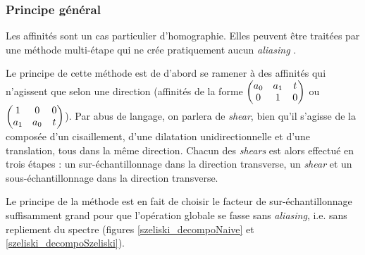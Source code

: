 \subsubsection{Principe général}
	
	Les affinités sont un cas particulier d'homographie. Elles peuvent être traitées par une méthode multi-étape qui ne crée pratiquement aucun \emph{aliasing} \cite{szeliski2010high}.
	
	Le principe de cette méthode est de d'abord se ramener à des affinités qui n'agissent que selon une direction (affinités de la forme $\begin{pmatrix} a_0 & a_1 & t\\ 0 & 1 & 0 \end{pmatrix}$ ou $\begin{pmatrix} 1 & 0 & 0\\ a_1 & a_0 & t \end{pmatrix}$). Par abus de langage, on parlera de \emph{shear}, bien qu'il s'agisse de la composée d'un cisaillement, d'une dilatation unidirectionnelle et d'une translation, tous dans la même direction. Chacun des \emph{shears} est alors effectué en trois étapes : un sur-échantillonnage dans la direction transverse, un \emph{shear} et un sous-échantillonnage dans la direction transverse.
	
	Le principe de la méthode est en fait de choisir le facteur de sur-échantillonnage suffisamment grand pour que l'opération globale se fasse sans \emph{aliasing}, i.e. sans repliement du spectre (figures \ref{szeliski_decompoNaive} et \ref{szeliski_decompoSzeliski}).
		
